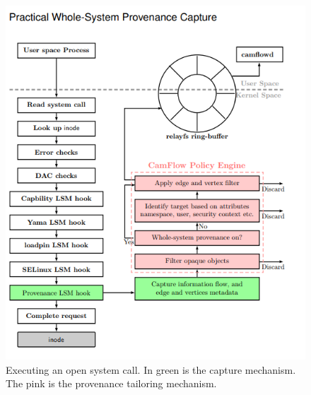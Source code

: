 \begin{figure}
	\centering
	\includegraphics[width=0.7\linewidth]{provenance-capture}
	\caption[open system call]{Executing an open system call. In green is the capture mechanism. The pink is the provenance tailoring mechanism.}
	\label{fig:provenance-capture}
\end{figure}
